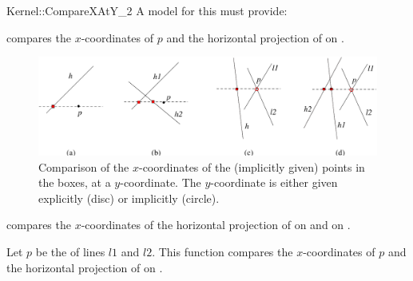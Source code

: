 \begin{ccRefFunctionObjectConcept}{Kernel::CompareXAtY_2}
A model for this must provide:


        {compares the $x$-coordinates of $p$ and the horizontal projection
         of  on %
         .
        }

\begin{ccTexOnly}
\begin{figure}[h]
\centerline{
  \includegraphics[width=\textwidth]{Kernel_23_ref/fig/compare_x_at_y}}
\caption{Comparison of the $x$-coordinates of the (implicitly given)
         points in the boxes, at a $y$-coordinate. The $y$-coordinate
         is either given explicitly (disc) or implicitly (circle).
         \label{fig:compare_x_at_y2}}
\end{figure}
\end{ccTexOnly}



{compares the $x$-coordinates of the horizontal projection 
 of  on  and on %
 .
}

      {Let $p$ be the  of lines $l1$ and $l2$.
       This function compares the $x$-coordinates of $p$ and 
       the horizontal projection of  on %
       .
}




\end{ccRefFunctionObjectConcept}
